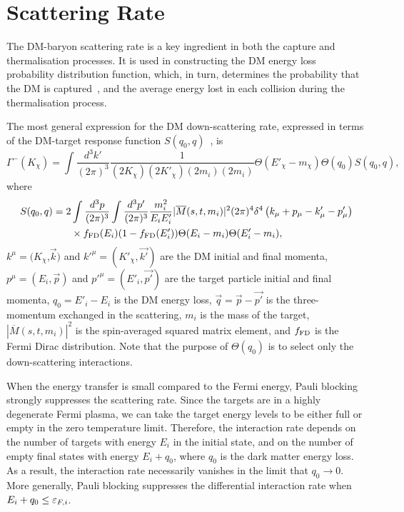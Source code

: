 \section{Scattering Rate}
\label{sec:intratetext}
The DM-baryon scattering rate is a key ingredient in both the capture and thermalisation processes. 
It is used in constructing the DM energy loss probability distribution function, which, in turn, determines the probability that the DM is captured~\cite{Bell:2020jou_sep_ImprovedTreatmentDark}, and the average energy lost in each collision during the thermalisation process.

The most general expression for the DM down-scattering rate, expressed in terms of the DM-target response function $S(q_0,q)$~\cite{Bertoni:2013bsa_dec_DarkMatterThermalization,Bell:2020jou_sep_ImprovedTreatmentDark}, is 
\begin{equation}
\Gamma^-(K_\chi) =   \int \frac{d^3k'}{(2\pi)^3} \frac{1}{(2K_\chi)(2K'_\chi)(2m_i)(2m_i)} \Theta(E'_\chi-m_\chi)\Theta(q_0)S(q_0,q), \label{eq:intratedeftext}
\end{equation} 
where
\begin{align}
S(q_0,q)  =   2 & \int \frac{d^3p}{(2\pi)^3}\int \frac{d^3p'}{(2\pi)^3} \frac{m_i^2}{E_i E'_i}|\overline{M}(s,t,m_i)|^2 
(2\pi)^4\delta^4\left(k_\mu+p_\mu-k'_\mu-p'_\mu\right)\nonumber\\
 &\times f_{\rm FD}(E_i)(1-f_{\rm FD}(E'_i)) \Theta(E_i-m_i)\Theta(E'_i-m_i),
 \label{eq:responsefunc}
\end{align}
$k^\mu=(K_\chi$,$\vec{k})$ and $k'^{\mu}=(K'_\chi,\vec{k'})$ are the DM initial and final momenta,  $p^\mu=(E_i,\vec{p})$ and $p'^{\mu}=(E'_i,\vec{p'})$ are the target particle initial and final momenta, $q_0=E'_i-E_i$ is the DM energy loss, $\vec{q}=\vec{p}-\vec{p'}$ is the three-momentum exchanged in the scattering, $m_i$  is the mass of the target, $|\overline{M}(s,t,m_i)|^2$ is the  spin-averaged squared matrix element, and $f_{\rm FD}$ is the Fermi Dirac distribution. Note that the purpose of $\Theta(q_0)$ is to select only the down-scattering interactions.


When the energy transfer is small compared to the Fermi energy, Pauli blocking strongly suppresses the scattering rate.  Since the targets are in a highly degenerate Fermi plasma, we can take the target energy levels to be either full or empty in the zero temperature limit. Therefore, the interaction rate depends on the number of targets with energy $E_i$ in the initial state, and on the number of empty final states with energy $E_i+q_0$, where $q_0$ is the dark matter energy loss. As a result, the interaction rate necessarily vanishes in the limit that  $q_0\rightarrow 0$.  More generally,  Pauli blocking suppresses the differential interaction rate when $E_i+q_0\le \varepsilon_{F,i}$. 



